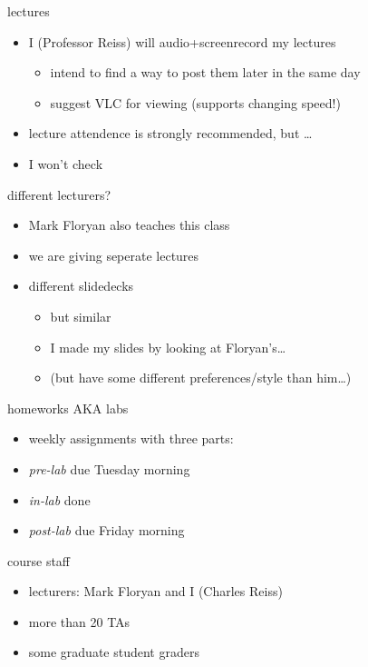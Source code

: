 \begin{frame}{lectures}
    \begin{itemize}
    \item I (Professor Reiss) will audio+screenrecord my lectures
        \begin{itemize}
        \item intend to find a way to post them later in the same day
        \item suggest VLC for viewing (supports changing speed!)
        \end{itemize}
    \item lecture attendence is strongly recommended, but \ldots
    \item I won't check
    \end{itemize}
\end{frame}

\begin{frame}{different lecturers?}
    \begin{itemize}
    \item Mark Floryan also teaches this class
    \item we are giving seperate lectures
    \item different slidedecks
        \begin{itemize}
        \item but similar
        \item I made my slides by looking at Floryan's\ldots
        \item (but have some different preferences/style than him\ldots)
        \end{itemize}
    \end{itemize}
\end{frame}

\begin{frame}{homeworks AKA labs}
    \begin{itemize}
    \item weekly assignments with three parts:
    \vspace{.5cm}
    \item \textit{pre-lab} due Tuesday morning
    \item \textit{in-lab} done 
    \item \textit{post-lab} due Friday morning
    \end{itemize}
\end{frame}

\begin{frame}{course staff}
    \begin{itemize}
        \item lecturers: Mark Floryan and I (Charles Reiss)
        \item more than 20 TAs
        \item some graduate student graders
    \end{itemize}
\end{frame}


